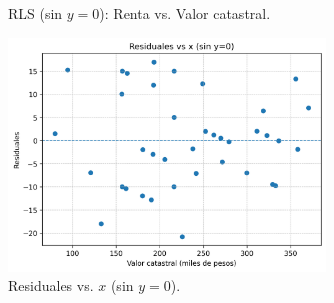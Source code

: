 \documentclass[10pt]{article}
\begin{document}
\begin{itemize}
\begin{figure}[H]
      \caption{RLS (sin $y=0$): Renta vs. Valor catastral.}
      \label{fig:cable_nz_line}
    \end{figure}
    \begin{figure}[H]
      \centering
      \includegraphics[width=0.75\textwidth]{../plots/python/ejercicio4/nz_resid_vs_x.png}
      \caption{Residuales vs. $x$ (sin $y=0$).}
      \label{fig:cable_nz_resid}
    \end{figure}


\end{itemize}
\end{document}
